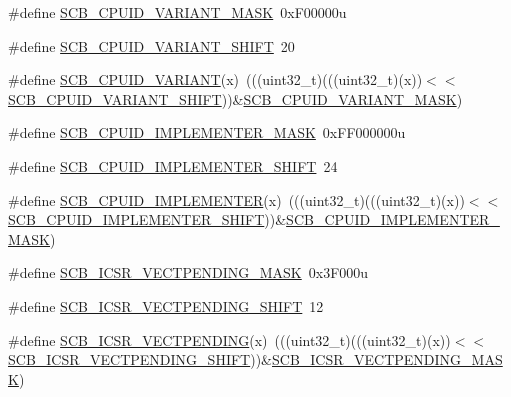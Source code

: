 \begin{DoxyCompactItemize}
\item 
\#define \hyperlink{group___s_c_b___register___masks_ga42f96b8e820835b499d29a04e593d363}{S\+C\+B\+\_\+\+C\+P\+U\+I\+D\+\_\+\+V\+A\+R\+I\+A\+N\+T\+\_\+\+M\+A\+SK}~0x\+F00000u
\item 
\#define \hyperlink{group___s_c_b___register___masks_ga810d19688c9813a71a60087f8ad98b2f}{S\+C\+B\+\_\+\+C\+P\+U\+I\+D\+\_\+\+V\+A\+R\+I\+A\+N\+T\+\_\+\+S\+H\+I\+FT}~20
\item 
\#define \hyperlink{group___s_c_b___register___masks_ga70aaff3998444e48466b386b2ce07553}{S\+C\+B\+\_\+\+C\+P\+U\+I\+D\+\_\+\+V\+A\+R\+I\+A\+NT}(x)~(((uint32\+\_\+t)(((uint32\+\_\+t)(x))$<$$<$\hyperlink{group___s_c_b___register___masks_ga810d19688c9813a71a60087f8ad98b2f}{S\+C\+B\+\_\+\+C\+P\+U\+I\+D\+\_\+\+V\+A\+R\+I\+A\+N\+T\+\_\+\+S\+H\+I\+FT}))\&\hyperlink{group___s_c_b___register___masks_ga42f96b8e820835b499d29a04e593d363}{S\+C\+B\+\_\+\+C\+P\+U\+I\+D\+\_\+\+V\+A\+R\+I\+A\+N\+T\+\_\+\+M\+A\+SK})
\item 
\#define \hyperlink{group___s_c_b___register___masks_gab1f83660e1dfa68aeccfed5a890725a9}{S\+C\+B\+\_\+\+C\+P\+U\+I\+D\+\_\+\+I\+M\+P\+L\+E\+M\+E\+N\+T\+E\+R\+\_\+\+M\+A\+SK}~0x\+F\+F000000u
\item 
\#define \hyperlink{group___s_c_b___register___masks_ga6729af9d9ed3840dae99f10bb2feb44d}{S\+C\+B\+\_\+\+C\+P\+U\+I\+D\+\_\+\+I\+M\+P\+L\+E\+M\+E\+N\+T\+E\+R\+\_\+\+S\+H\+I\+FT}~24
\item 
\#define \hyperlink{group___s_c_b___register___masks_gad05c2dd61538f0fa4ecbb190e78715cd}{S\+C\+B\+\_\+\+C\+P\+U\+I\+D\+\_\+\+I\+M\+P\+L\+E\+M\+E\+N\+T\+ER}(x)~(((uint32\+\_\+t)(((uint32\+\_\+t)(x))$<$$<$\hyperlink{group___s_c_b___register___masks_ga6729af9d9ed3840dae99f10bb2feb44d}{S\+C\+B\+\_\+\+C\+P\+U\+I\+D\+\_\+\+I\+M\+P\+L\+E\+M\+E\+N\+T\+E\+R\+\_\+\+S\+H\+I\+FT}))\&\hyperlink{group___s_c_b___register___masks_gab1f83660e1dfa68aeccfed5a890725a9}{S\+C\+B\+\_\+\+C\+P\+U\+I\+D\+\_\+\+I\+M\+P\+L\+E\+M\+E\+N\+T\+E\+R\+\_\+\+M\+A\+SK})
\item 
\#define \hyperlink{group___s_c_b___register___masks_ga75b38d5feedc920a7d0a51484330b7d7}{S\+C\+B\+\_\+\+I\+C\+S\+R\+\_\+\+V\+E\+C\+T\+P\+E\+N\+D\+I\+N\+G\+\_\+\+M\+A\+SK}~0x3\+F000u
\item 
\#define \hyperlink{group___s_c_b___register___masks_ga345baf83f90de34c6c67edb24968fcc7}{S\+C\+B\+\_\+\+I\+C\+S\+R\+\_\+\+V\+E\+C\+T\+P\+E\+N\+D\+I\+N\+G\+\_\+\+S\+H\+I\+FT}~12
\item 
\#define \hyperlink{group___s_c_b___register___masks_ga988d490e8d0de25eba6c8622d13bc725}{S\+C\+B\+\_\+\+I\+C\+S\+R\+\_\+\+V\+E\+C\+T\+P\+E\+N\+D\+I\+NG}(x)~(((uint32\+\_\+t)(((uint32\+\_\+t)(x))$<$$<$\hyperlink{group___s_c_b___register___masks_ga345baf83f90de34c6c67edb24968fcc7}{S\+C\+B\+\_\+\+I\+C\+S\+R\+\_\+\+V\+E\+C\+T\+P\+E\+N\+D\+I\+N\+G\+\_\+\+S\+H\+I\+FT}))\&\hyperlink{group___s_c_b___register___masks_ga75b38d5feedc920a7d0a51484330b7d7}{S\+C\+B\+\_\+\+I\+C\+S\+R\+\_\+\+V\+E\+C\+T\+P\+E\+N\+D\+I\+N\+G\+\_\+\+M\+A\+SK})
$$
\end{DoxyCompactItemize}
